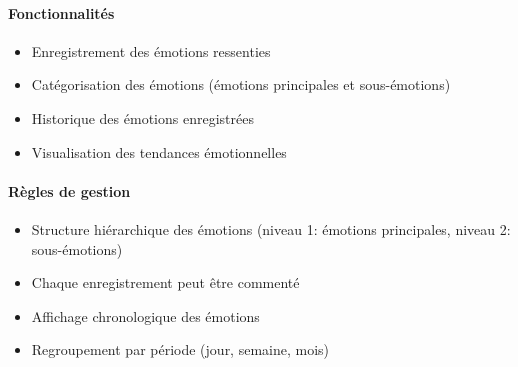 \documentclass[
]{article}
\providecommand{\tightlist}{%
  \setlength{\itemsep}{0pt}\setlength{\parskip}{0pt}}
\begin{document}
\paragraph{Fonctionnalités}\label{fonctionnalituxe9s-3}

\begin{itemize}
\tightlist
\item
  Enregistrement des émotions ressenties
\item
  Catégorisation des émotions (émotions principales et sous-émotions)
\item
  Historique des émotions enregistrées
\item
  Visualisation des tendances émotionnelles
\end{itemize}

\paragraph{Règles de gestion}\label{ruxe8gles-de-gestion-3}

\begin{itemize}
\tightlist
\item
  Structure hiérarchique des émotions (niveau 1: émotions principales,
  niveau 2: sous-émotions)
\item
  Chaque enregistrement peut être commenté
\item
  Affichage chronologique des émotions
\item
  Regroupement par période (jour, semaine, mois)
\end{itemize}
\end{document}
